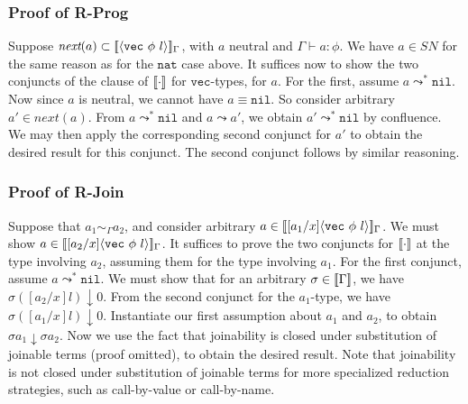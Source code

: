 \documentclass[copyright]{eptcs}
\newcommand{\next}[0]{\textit{next}}
\newcommand{\SN}[0]{\textit{SN}}
\newcommand{\vc}[0]{\texttt{vec}}
\newcommand{\nat}[0]{\texttt{nat}}
\newcommand{\nil}[0]{\texttt{nil}}
\newcommand{\interp}[1]{[\negthinspace[#1]\negthinspace]}
\begin{document}
\subsubsection{Proof of \textbf{R-Prog}}

Suppose $\next(a)\subset \interp{\langle\vc\ \phi\ l\rangle}_\Gamma$,
with $a$ neutral and $\Gamma\vdash a:\phi$.  We have $a\in\SN$ for the
same reason as for the $\nat$ case above.  It suffices now to show the
two conjuncts of the clause of $\interp{\cdot}$ for $\vc$-types, for
$a$.  For the first, assume $a\leadsto^*\nil$.  Now since $a$ is
neutral, we cannot have $a \equiv \nil$.  So consider arbitrary
$a'\in\next(a)$.  From $a\leadsto^*\nil$ and $a\leadsto a'$, we obtain
$a'\leadsto^*\nil$ by confluence.  We may then apply the corresponding
second conjunct for $a'$ to obtain the desired result for this
conjunct.  The second conjunct follows by similar reasoning.

\subsubsection{Proof of \textbf{R-Join}}

Suppose that $a_1\sim_\Gamma a_2$, and consider arbitrary
$a\in\interp{[a_1/x]\langle\vc\ \phi\ l\rangle}_\Gamma$.  We must show
$a\in\interp{[a_2/x]\langle\vc\ \phi\ l\rangle}_\Gamma$.  It suffices
to prove the two conjuncts for $\interp{\cdot}$ at the type involving
$a_2$, assuming them for the type involving $a_1$.  For the first
conjunct, assume $a\leadsto^*\nil$.  We must show that for an
arbitrary $\sigma\in\interp{\Gamma}$, we have $\sigma
([a_2/x]l)\downarrow 0$.  From the second conjunct for the $a_1$-type,
we have $\sigma ([a_1/x]l)\downarrow 0$.  Instantiate our first
assumption about $a_1$ and $a_2$, to obtain $\sigma a_1\downarrow
\sigma a_2$.  Now we use the fact that joinability is closed under
substitution of joinable terms (proof omitted), to obtain the desired
result.  Note that joinability is not closed under substitution of
joinable terms for more specialized reduction strategies, such as
call-by-value or call-by-name.
\end{document}

